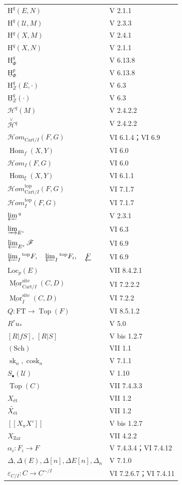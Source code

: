 \begin{longtable}{p{}p{}}
$\mathrm H^q(E,N)$ & V 2.1.1\\
$\mathrm H^q(\mathscr U,M)$ & V 2.3.3\\
$\mathrm H^q(X,M)$ & V 2.4.1\\
$\mathrm H^q(X,N)$ & V 2.1.1\\
$\mathrm H^q_\Phi$ & V 6.13.8\\
$\underline{\mathrm H}{}^p_\Phi$ & V 6.13.8\\
$\mathrm H_Z^q(E,\cdot)$ & V 6.3\\
$\underline{\mathrm H}{}_Z^q(\cdot)$ & V 6.3\\
$\mathscr H^q(M)$ & V 2.4.2.2\\
$\overset{\vee}{\mathscr H}{}^q$ & V 2.4.2.2\\
$\mathscr H\!om_{\mathrm{Cart}/I}(F,G)$ & VI 6.1.4；VI 6.9\\
$\operatorname{Hom}_f(X,Y)$ & VI 6.0\\
$\mathscr H\!om_I(F,G)$ & VI 6.0\\
$\operatorname{Hom}_\xi(X,Y)$ & VI 6.1.1\\
$\mathscr H\!om_{\mathrm{Cart}/I}^{\mathrm{top}}(F,G)$ & VI 7.1.7\\
$\mathscr H\!om_I^{\mathrm{top}}(F,G)$ & VI 7.1.7\\
$\varprojlim{}^q$ & V 2.3.1\\
$\varinjlim_{E^\circ}$ & VI 6.3\\
$\varprojlim_{E^\circ}\mathscr F$ & VI 6.9\\
$\varprojlim_I{}^{\mathrm{top}}F,\quad\varprojlim_I{}^{\mathrm{top}}F_i,\quad\underleftarrow F$ & VI 6.9\\
$\mathrm{Loc}_p(E)$ & VII 8.4.2.1\\
$\underline{\operatorname{Mor}}^{\mathrm{site}}_{\mathrm{Cart}/I}(C,D)$ & VI 7.2.2.2\\
$\underline{\operatorname{Mor}}^{\mathrm{site}}_I(C,D)$ & VI 7.2.2\\
$Q:\mathrm{FT}\to\operatorname{Top}(F)$ & VI 8.5.1.2\\
$R^ru_*$ & V 5.0\\
$[R|fS],\ [R|S]$ & V bis 1.2.7\\
$(\mathrm{Sch})$ & VII 1.1\\
$\operatorname{sk}_n,\operatorname{cosk}_n$ & V 7.1.1\\
$S_\bullet(\mathscr U)$ & V 1.10\\
$\operatorname{Top}(C)$ & VII 7.4.3.3\\
$X_{\text{ét}}$ & VII 1.2\\
$\widetilde{X_{\text{ét}}}$ & VII 1.2\\
$[[X_uX']]$ & V bis 1.2.7\\
$X_{\mathrm{Zar}}$ & VII 4.2.2\\
$\alpha_i:F_i\to F$ & V 7.4.3.4；VI 7.4.12\\
$\Delta,\Delta(E),\Delta[n],\Delta E[n],\Delta_n$ & V 7.1.0\\
$\varepsilon_{C/I}:C\to C^{\sim/I}$ & VI 7.2.6.7；VI 7.4.11\\
\end{longtable}
